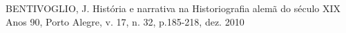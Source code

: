 \documentclass[
12pt,		%
openright,	%
twoside,  %
a4paper,			%
chapter=TITLE,		%
english,			%
french,				%
spanish,			%
brazil				%
]{USPSC-classe/USPSC}
\begin{document}
\begin{flushleft}
\begin{flushleft}
\begin{flushleft}
\begin{flushleft}
\begin{flushleft}
\begin{flushleft}
\begin{flushleft}
\begin{flushleft}
\begin{flushleft}
\begin{flushleft}
[BENTIVOGLIO, 2010] BENTIVOGLIO, J. Hist\'oria e narrativa na Historiografia alem\~a do s\'eculo XIX Anos 90, Porto Alegre, v. 17, n. 32, p.185-218, dez. 2010
\end{flushleft}


\end{flushleft}


\end{flushleft}


\end{flushleft}


\end{flushleft}


\end{flushleft}


\end{flushleft}


\end{flushleft}


\end{flushleft}


\end{flushleft}
\end{document}
